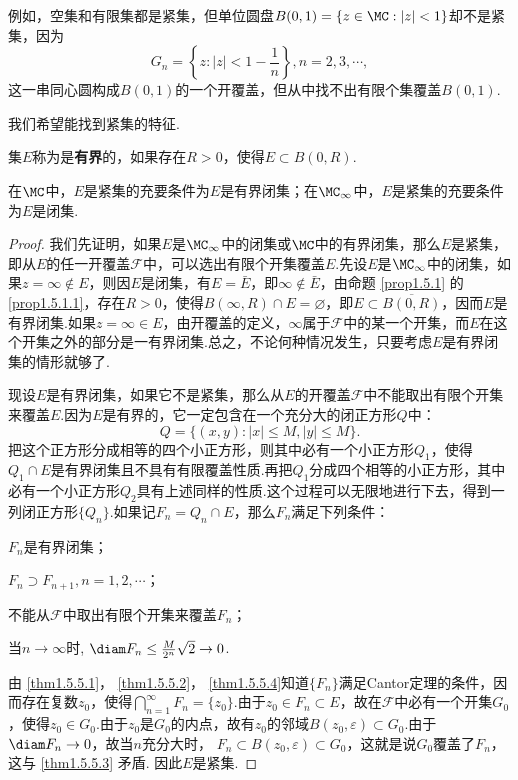 例如，空集和有限集都是紧集，但单位圆盘$B(0,1)=\{z\in\MC:|z|<1\}$却不是紧集，因为
  \[G_n=\left\{z:|z|<1-\frac1n\right\},n=2,3,\cdots,\]
这一串同心圆构成$B(0,1)$的一个开覆盖，但从中找不出有限个集覆盖$B(0,1)$.

我们希望能找到紧集的特征.

集$E$称为是\textbf{有界}的，如果存在$R>0$，使得$E\subset B(0,R)$.
\begin{theorem}\label{thm1.5.5}
在$\MC$中，$E$是紧集的充要条件为$E$是有界闭集；在$\MC_\infty$中，$E$是紧集的充要条件为$E$是闭集.
\end{theorem}
\begin{proof}
我们先证明，如果$E$是$\MC_\infty$中的闭集或$\MC$中的有界闭集，那么$E$是紧集，即从$E$的任一开覆盖$\mathscr F$中，可以选出有限个开集覆盖$E$.先设$E$是$\MC_\infty$中的闭集，如果$z=\infty\notin E$，则因$E$是闭集，有$E=\bar E$，即$\infty\notin\bar E$，由命题 \ref{prop1.5.1} 的 \ref{prop1.5.1.1}，存在$R>0$，使得$B(\infty,R)\cap E=\varnothing$，即$E\subset\overline{B(0,R)}$，因而$E$是有界闭集.如果$z=\infty\in E$，由开覆盖的定义，$\infty$属于$\mathscr F$中的某一个开集，而$E$在这个开集之外的部分是一有界闭集.总之，不论何种情况发生，只要考虑$E$是有界闭集的情形就够了.

现设$E$是有界闭集，如果它不是紧集，那么从$E$的开覆盖$\mathscr F$中不能取出有限个开集来覆盖$E$.因为$E$是有界的，它一定包含在一个充分大的闭正方形$Q$中：
\[Q=\{(x,y):|x|\le M,|y|\le M\}.\]
把这个正方形分成相等的四个小正方形，则其中必有一个小正方形$Q_1$，使得$Q_1\cap E$是有界闭集且不具有有限覆盖性质.再把$Q_1$分成四个相等的小正方形，其中必有一个小正方形$Q_2$具有上述同样的性质.这个过程可以无限地进行下去，得到一列闭正方形$\{Q_n\}$.如果记$F_n=Q_n\cap E$，那么$F_n$满足下列条件：
\begin{eenum}
 \item  \label{thm1.5.5.1}$F_n$是有界闭集；
 \item  \label{thm1.5.5.2}$F_n\supset F_{n+1},n=1,2,\cdots$；
 \item  \label{thm1.5.5.3}不能从$\mathscr F$中取出有限个开集来覆盖$F_n$；
 \item  \label{thm1.5.5.4}当$n\to\infty$时, $\diam F_n\le\frac M{2^n}\sqrt2\to0$.
\end{eenum}
由 \ref{thm1.5.5.1}， \ref{thm1.5.5.2}， \ref{thm1.5.5.4}知道$\{F_n\}$满足Cantor定理的条件，因而存在复数$z_0$，使得$\bigcap_{n=1}^\infty F_n=\{z_0\}$.由于$z_0\in F_n\subset E$，故在$\mathscr F$中必有一个开集$G_0$，使得$z_0\in G_0$.由于$z_0$是$G_0$的内点，故有$z_0$的邻域$B(z_0,\varepsilon)\subset G_0$.由于$\diam F_n\to0$，故当$n$充分大时， $F_n\subset B(z_0,\varepsilon)\subset G_0$，这就是说$G_0$覆盖了$F_n$，这与 \ref{thm1.5.5.3} 矛盾. 因此$E$是紧集.


\end{proof}
